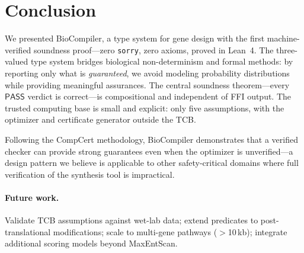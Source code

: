 \documentclass[runningheads]{llncs}
\newcommand{\PASS}{\ensuremath{\mathsf{PASS}}\xspace}
\begin{document}
\section{Conclusion}\label{sec:conclusion}

We presented BioCompiler, a type system for gene design with the first
machine-verified soundness proof---zero \texttt{sorry}, zero axioms,
proved in Lean~4.
The three-valued type system bridges biological non-determinism and
formal methods: by reporting only what is \emph{guaranteed}, we avoid
modeling probability distributions while providing meaningful
assurances.
The central soundness theorem---every \PASS{} verdict is correct---is
compositional and independent of FFI output.
The trusted computing base is small and explicit: only five
assumptions, with the optimizer and certificate generator outside the
TCB.

Following the CompCert methodology, BioCompiler demonstrates that a
verified checker can provide strong guarantees even when the optimizer
is unverified---a design pattern we believe is applicable to other
safety-critical domains where full verification of the synthesis tool
is impractical.

\paragraph{Future work.}
Validate TCB assumptions against wet-lab data; extend predicates to
post-translational modifications; scale to multi-gene pathways
($>$10\,kb); integrate additional scoring models beyond MaxEntScan.
\end{document}
